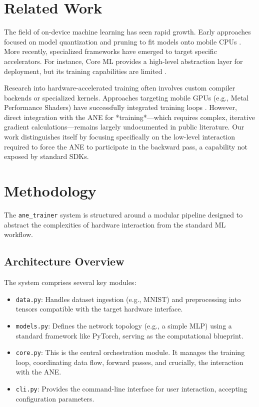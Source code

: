\documentclass[11pt,a4paper]{article}
\begin{document}
\section{Related Work}
The field of on-device machine learning has seen rapid growth. Early approaches focused on model quantization and pruning to fit models onto mobile CPUs \cite{mobile_ml_survey}. More recently, specialized frameworks have emerged to target specific accelerators. For instance, Core ML provides a high-level abstraction layer for deployment, but its training capabilities are limited \cite{coreml_docs}.

Research into hardware-accelerated training often involves custom compiler backends or specialized kernels. Approaches targeting mobile GPUs (e.g., Metal Performance Shaders) have successfully integrated training loops \cite{metal_training}. However, direct integration with the ANE for *training*—which requires complex, iterative gradient calculations—remains largely undocumented in public literature. Our work distinguishes itself by focusing specifically on the low-level interaction required to force the ANE to participate in the backward pass, a capability not exposed by standard SDKs.

\section{Methodology}
The \texttt{ane\_trainer} system is structured around a modular pipeline designed to abstract the complexities of hardware interaction from the standard ML workflow.

\subsection{Architecture Overview}
The system comprises several key modules:
\begin{itemize}
    \item \texttt{data.py}: Handles dataset ingestion (e.g., MNIST) and preprocessing into tensors compatible with the target hardware interface.
    \item \texttt{models.py}: Defines the network topology (e.g., a simple MLP) using a standard framework like PyTorch, serving as the computational blueprint.
    \item \texttt{core.py}: This is the central orchestration module. It manages the training loop, coordinating data flow, forward passes, and crucially, the interaction with the ANE.
    \item \texttt{cli.py}: Provides the command-line interface for user interaction, accepting configuration parameters.
\end{itemize}
\end{document}
